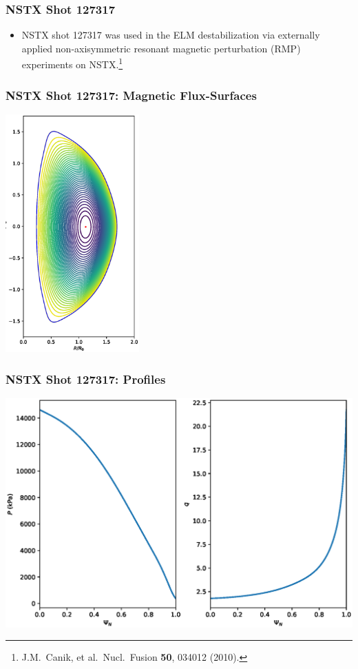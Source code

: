 \documentclass{beamer}
\begin{document}
\begin{frame}
\frametitle{NSTX Shot 127317}
 
\begin{itemize}
\item NSTX shot 127317 was used in the ELM destabilization via externally applied non-axisymmetric
resonant magnetic perturbation (RMP) experiments on NSTX.\footnote{J.M.~Canik, et al.\ Nucl.\ Fusion {\bf 50}, 034012 (2010).}
\end{itemize}
\end{frame}

\begin{frame}
\frametitle{NSTX Shot 127317: Magnetic Flux-Surfaces}

\begin{center}
\includegraphics[height=3.6in]{Equilibrium.eps}
\end{center}

\end{frame}

\begin{frame}
\frametitle{NSTX Shot 127317: Profiles}

\begin{center}
\includegraphics[width=\textwidth]{Profiles.eps}
\end{center}

\end{frame}
\end{document}
